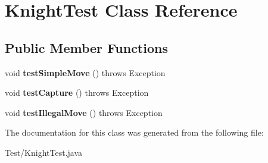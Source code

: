 \hypertarget{class_knight_test}{}\section{Knight\+Test Class Reference}
\label{class_knight_test}
\subsection*{Public Member Functions}
\begin{DoxyCompactItemize}
\item 
\hypertarget{class_knight_test_a73de9571a449a308819f74a48aca89d1}{}void {\bfseries test\+Simple\+Move} ()  throws Exception \label{class_knight_test_a73de9571a449a308819f74a48aca89d1}

\item 
\hypertarget{class_knight_test_ac1854121a956826ca37e70ff966e5ccf}{}void {\bfseries test\+Capture} ()  throws Exception\label{class_knight_test_ac1854121a956826ca37e70ff966e5ccf}

\item 
\hypertarget{class_knight_test_ac8113b7b91cf88b68f610cc5c8348666}{}void {\bfseries test\+Illegal\+Move} ()  throws Exception \label{class_knight_test_ac8113b7b91cf88b68f610cc5c8348666}

\end{DoxyCompactItemize}


The documentation for this class was generated from the following file\+:\begin{DoxyCompactItemize}
\item 
Test/Knight\+Test.\+java\end{DoxyCompactItemize}
